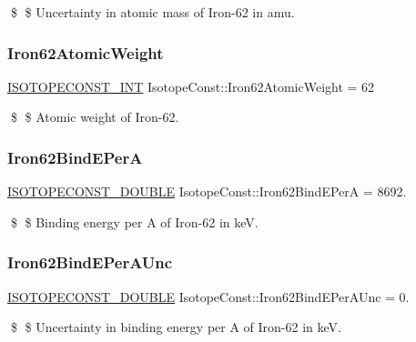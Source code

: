 \$ \$ Uncertainty in atomic mass of Iron-\/62 in amu. \mbox{\label{group___isotope_const-_iron-_fe62_gab6bf8cf0ef831ce12cd23159c099306e}} 
\subsubsection{\texorpdfstring{Iron62\+Atomic\+Weight}{Iron62AtomicWeight}}
{\footnotesize\ttfamily \mbox{\hyperlink{group___isotope_const-_macros_ga5f18360b3e99483a35c32d789e62621c}{I\+S\+O\+T\+O\+P\+E\+C\+O\+N\+S\+T\+\_\+\+I\+NT}} Isotope\+Const\+::\+Iron62\+Atomic\+Weight = 62}

\$ \$ Atomic weight of Iron-\/62. \mbox{\label{group___isotope_const-_iron-_fe62_ga8cde6af82cef858b438d97a3dd84f215}} 
\subsubsection{\texorpdfstring{Iron62\+Bind\+E\+PerA}{Iron62BindEPerA}}
{\footnotesize\ttfamily \mbox{\hyperlink{group___isotope_const-_macros_ga8f45a7272ce02c0b4c65c44636ed719a}{I\+S\+O\+T\+O\+P\+E\+C\+O\+N\+S\+T\+\_\+\+D\+O\+U\+B\+LE}} Isotope\+Const\+::\+Iron62\+Bind\+E\+PerA = 8692.}

\$ \$ Binding energy per A of Iron-\/62 in keV. \mbox{\label{group___isotope_const-_iron-_fe62_gabcc7ea2eb467d0f525e7193a0c6d3280}} 
\subsubsection{\texorpdfstring{Iron62\+Bind\+E\+Per\+A\+Unc}{Iron62BindEPerAUnc}}
{\footnotesize\ttfamily \mbox{\hyperlink{group___isotope_const-_macros_ga8f45a7272ce02c0b4c65c44636ed719a}{I\+S\+O\+T\+O\+P\+E\+C\+O\+N\+S\+T\+\_\+\+D\+O\+U\+B\+LE}} Isotope\+Const\+::\+Iron62\+Bind\+E\+Per\+A\+Unc = 0.}

\$ \$ Uncertainty in binding energy per A of Iron-\/62 in keV. \mbox{\label{group___isotope_const-_iron-_fe62_ga0f17a30de3c275cf920d7e91fbb0b01b}} 
